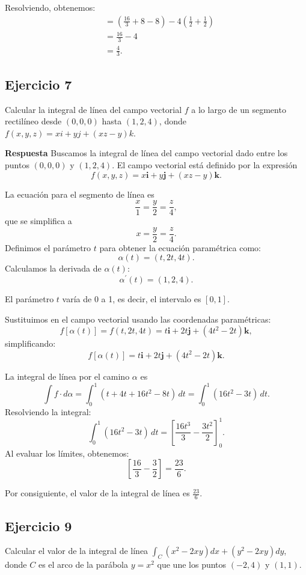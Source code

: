 \documentclass{report}
\begin{document}
Resolviendo, obtenemos:
\[
\begin{aligned}
& = \left(\frac{16}{3} + 8 - 8\right) - 4\left(\frac{1}{2} + \frac{1}{2}\right) \\
& = \frac{16}{3} - 4 \\
& = \frac{4}{3}.
\end{aligned}
\]

\subsection*{Ejercicio 7}
Calcular la integral de línea del campo vectorial $f$ a lo largo de un segmento rectilíneo desde $(0,0,0)$ hasta $(1,2,4)$, donde $f(x, y, z)=x i+y j+(x z-y) k$.

\textbf{Respuesta}
Buscamos la integral de línea del campo vectorial dado entre los puntos \((0,0,0)\) y \((1,2,4)\). El campo vectorial está definido por la expresión
\[
f(x, y, z) = x \mathbf{i} + y \mathbf{j} + (x z - y) \mathbf{k}.
\]

La ecuación para el segmento de línea es
\[
\frac{x}{1} = \frac{y}{2} = \frac{z}{4},
\]
que se simplifica a
\[
x = \frac{y}{2} = \frac{z}{4}.
\]
Definimos el parámetro \(t\) para obtener la ecuación paramétrica como:
\[
\alpha(t) = (t, 2t, 4t).
\]
Calculamos la derivada de \(\alpha(t)\):
\[
\alpha^{\prime}(t) = (1, 2, 4).
\]

El parámetro \(t\) varía de 0 a 1, es decir, el intervalo es \([0, 1]\).

Sustituimos en el campo vectorial usando las coordenadas paramétricas:
\[
f[\alpha(t)] = f(t, 2t, 4t) = t \mathbf{i} + 2t \mathbf{j} + (4t^2 - 2t) \mathbf{k},
\]
simplificando:
\[
f[\alpha(t)] = t \mathbf{i} + 2t \mathbf{j} + (4t^2 - 2t) \mathbf{k}.
\]

La integral de línea por el camino \(\alpha\) es
\[
\int f \cdot d \alpha = \int_{0}^{1} \left(t + 4t + 16t^2 - 8t \right) \, dt = \int_{0}^{1} (16t^2 - 3t) \, dt.
\]
Resolviendo la integral:
\[
\int_{0}^{1} (16t^2 - 3t) \, dt = \left[\frac{16t^3}{3} - \frac{3t^2}{2}\right]_{0}^{1}.
\]
Al evaluar los límites, obtenemos:
\[
\left[\frac{16}{3} - \frac{3}{2}\right] = \frac{23}{6}.
\]

Por consiguiente, el valor de la integral de línea es \(\frac{23}{6}\).

\subsection*{Ejercicio 9}
Calcular el valor de la integral de línea \(\int_{C} \left(x^{2} - 2 x y\right) dx + \left(y^{2} - 2 x y\right) dy\), donde \(C\) es el arco de la parábola \(y = x^{2}\) que une los puntos \((-2,4)\) y \((1,1)\).
\end{document}
